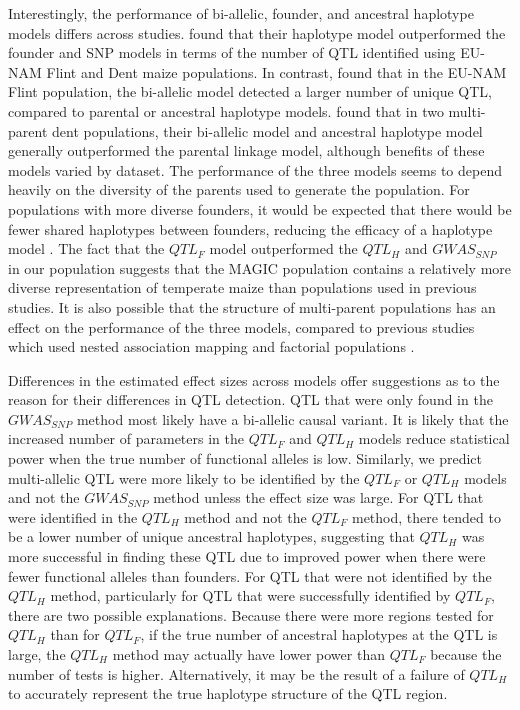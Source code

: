 \documentclass[9pt,twocolumn,twoside]{gsag3jnl}
\begin{document}
Interestingly, the performance of bi-allelic, founder, and ancestral haplotype models differs across studies.
\cite{Giraud} found that their haplotype model outperformed the founder and SNP models in terms of the number of QTL identified using EU-NAM Flint and Dent maize populations.
In contrast, \cite{Garin2} found that in the EU-NAM Flint population, the bi-allelic model detected a larger number of unique QTL, compared to parental or ancestral haplotype models.
\cite{Bardol} found that in two multi-parent dent populations, their bi-allelic model and ancestral haplotype model generally outperformed the parental linkage model, although benefits of these models varied by dataset.
The performance of the three models seems to depend heavily on the diversity of the parents used to generate the population.
For populations with more diverse founders, it would be expected that there would be fewer shared haplotypes between founders, reducing the efficacy of a haplotype model \citep{Giraud}.
The fact that the $QTL_F$ model outperformed the $QTL_H$ and $GWAS_{SNP}$ in our population suggests that the MAGIC population contains a relatively more diverse representation of temperate maize than populations used in previous studies.
It is also possible that the structure of multi-parent populations has an effect on the performance of the three models, compared to previous studies which used nested association mapping \citep{Giraud,Garin2} and factorial populations \cite{Bardol}.

Differences in the estimated effect sizes across models offer suggestions as to the reason for their differences in QTL detection.
QTL that were only found in the $GWAS_{SNP}$ method most likely have a bi-allelic causal variant.
It is likely that the increased number of parameters in the $QTL_F$ and $QTL_H$ models reduce statistical power when the true number of functional alleles is low.
Similarly, we predict multi-allelic QTL were more likely to be identified by the $QTL_F$ or $QTL_H$ models and not the $GWAS_{SNP}$ method unless the effect size was large.
For QTL that were identified in the $QTL_H$ method and not the $QTL_F$ method, there tended to be a lower number of unique ancestral haplotypes, suggesting that $QTL_H$ was more successful in finding these QTL due to improved power when there were fewer functional alleles than founders.
For QTL that were not identified by  the $QTL_H$ method, particularly for QTL that were successfully identified by $QTL_F$, there are two possible explanations.
Because there were more regions tested for $QTL_H$ than for $QTL_F$, if the true number of ancestral haplotypes at the QTL is large, the $QTL_H$ method may actually have lower power than $QTL_F$ because the number of tests is higher.
Alternatively, it may be the result of a failure of $QTL_H$ to accurately represent the true haplotype structure of the QTL region.
\end{document}
